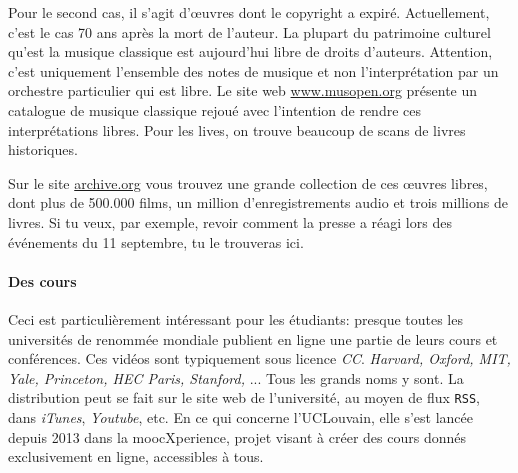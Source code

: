 \documentclass[10pt]{../fiche}
\begin{document}
Pour le second cas, il s'agit d'\oe uvres dont le copyright a expiré. Actuellement, c'est le cas 70 ans après la mort de l'auteur.
La plupart du patrimoine culturel qu'est la musique classique est aujourd'hui libre de droits d'auteurs.
Attention, c'est uniquement l'ensemble des notes de musique et non l'interprétation par un orchestre particulier qui est libre.
Le site web \url{www.musopen.org} présente un catalogue de musique classique rejoué avec l'intention de rendre ces interprétations libres. Pour les lives, on trouve beaucoup de scans de livres historiques.

Sur le site \url{archive.org} vous trouvez une grande collection de ces \oe uvres libres, dont plus de 500.000 films, un million d’enregistrements audio et trois millions de livres.
Si tu veux, par exemple, revoir comment la presse a réagi lors des événements du 11 septembre, tu le trouveras ici.

\paragraph{Des cours}
Ceci est particulièrement intéressant pour les étudiants: presque toutes les universités de renommée mondiale publient en ligne une partie de leurs cours et conférences.
Ces vidéos sont typiquement sous licence \textit{CC}. \textit{Harvard, Oxford, MIT, Yale, Princeton, HEC Paris, Stanford, }... Tous les grands noms y sont.
La distribution peut se fait sur le site web de l'université, au moyen de flux \texttt{RSS}, dans \textit{iTunes}, \textit{Youtube}, etc.
En ce qui concerne l'UCLouvain, elle s'est lancée depuis 2013 dans la moocXperience, projet visant à créer des cours donnés exclusivement en ligne, accessibles à tous.
\end{document}
